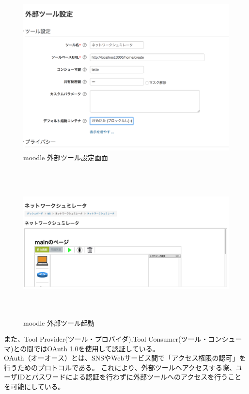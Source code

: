 \begin{figure}[htbp]
  \begin{center}
    \includegraphics[clip,width=12.0cm,height=8.0cm]{img/外部ツール設定.png}
    \caption{moodle 外部ツール設定画面}
    \label{fig:moodle config}
  \end{center}
\end{figure}

\begin{figure}[htbp]
  \begin{center}
    \includegraphics[clip,width=12.0cm,height=8.0cm]{img/LTI起動画面.png}
    \caption{moodle 外部ツール起動}
    \label{fig:moodle kidou}
  \end{center}
\end{figure}


また、Tool Provider(ツール・プロバイダ),Tool Consumer(ツール・コンシューマ)との間ではOAuth 1.0を使用して認証している。\\

OAuth（オーオース）とは、SNSやWebサービス間で「アクセス権限の認可」を行うためのプロトコルである。
これにより、外部ツールへアクセスする際、ユーザIDとパスワードによる認証を行わずに外部ツールへのアクセスを行うことを可能にしている。


